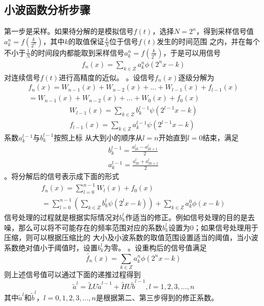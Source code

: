 \subsection{小波函数分析步骤}
第一步是采样。如果待分解的是模拟信号$f(t)$，选择$N=2^{n}$，得到采样信号值$a_{k}^{n}=f(\frac{k}{2^{n}})$，其中$k$的取值保证$\frac{k}{N}$位于信号$f(t)$发生的时间范围
之内，并在每个不小于$\frac{1}{N}$的时间段内都能取到采样信号$a_{k}^{n}=f(\frac{k}{2^{n}})$，于是可以用信号
\begin{gather}
f_{n}(x)=\sum_{k\in Z}a_{k}^{n}\phi(2^{n}x-k)
\end{gather}
对连续信号$f(t)$进行高精度的近似。
。设信号$f_{n}(x)$逐级分解为
\begin{gather}
	f_{n}(x)=W_{n-1}(x)+W_{n-2}(x)+...+W_{l-1}(x)+f_{l-1}(x) \nonumber \\
			=W_{n-1}(x)+W_{n-2}(x)+...+W_{0}(x)+f_{0}(x)
\end{gather}
\begin{gather*}
W_{l-1}(x)=\sum_{k\in Z}b_{k}^{l-1}\psi(2^{l-1}x-k)\\
f_{l-1}(x)=\sum_{k\in Z}a_{k}^{l-1}\psi(2^{l-1}x-k)
\end{gather*}
系数$a_{k}^{l-1}$与$b_{k}^{l-1}$按照上标
从大到小的顺序从$l=n$开始直到$l=0$结束，满足
\begin{gather}
	b_{k}^{l-1}=\frac{a_{2k}^{l}-a_{2k+1}^{l}}{2}\\
	a_{k}^{l-1}=\frac{a_{2k}^{l}+a_{2k+1}^{l}}{2}
\end{gather}
。将分解后的信号表示成下面的形式
\begin{gather}
	f_{n}(x)=\sum_{l=0}^{n-1}W_{l}(x)+f_{0}(x)\nonumber \\
			=\sum_{l=0}^{n-1}(\sum_{k\in Z}b_{k}^{l}\psi(2^{l}x-k))+\sum_{k\in Z}a_{k}^{0}\phi(x-k)
\end{gather}
信号处理的过程就是根据实际情况对$b_{k}^{l}$作适当的修正。例如信号处理的目的是去噪，那么可以将不可能存在的频率范围对应的系数$b_{k}^{l}$设置为0；如果信号处理用于压缩，则可以根据压缩比的
大小及小波系数的取值范围设置适当的阈值，当小波系数绝对值小于阈值时，设置$b_{k}^{l}$为零。
。设重构后的信号值满足
\begin{equation}
	\widetilde{f_{n}}(x)=\sum_{k\in Z}a_{k}^{n}\phi(2^{n}x-k)
\end{equation}
则上述信号值可以通过下面的递推过程得到
\begin{equation}
	\widetilde{a}^{l}=\widetilde{L}U\widetilde{a}^{l-1}+\widetilde{H}U\widetilde{b}^{l-1}, l=1,2,3,...,n
\end{equation}
其中$\widetilde{a}^{l}$和$\widetilde{b}^{l}$，$l=0,1,2,3,...,n$是根据第二、第三步得到的修正系数。
